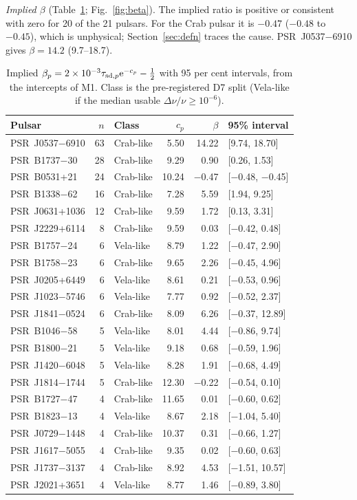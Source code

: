 \documentclass[fleqn,usenatbib]{mnras}
\newcommand{\dnu}{\Delta\nu/\nu}
\newcommand{\psr}[1]{PSR~#1}
\begin{document}
\emph{Implied $\beta$} (Table~\ref{tab:beta}; Fig.~\ref{fig:beta}). The
implied ratio is positive or consistent with zero for 20 of the 21 pulsars.
For the Crab pulsar it is $-0.47$ ($-0.48$ to $-0.45$), which is
unphysical; Section~\ref{sec:defn} traces the cause. \psr{J0537$-$6910}
gives $\beta=14.2$ (9.7--18.7).

\begin{table}
\centering
\caption{Implied $\beta_p=2\times10^{-3}\tau_{{\rm sd},p}{\rm e}^{-c_p}-
\tfrac12$ with 95 per cent intervals, from the intercepts of M1. Class is
the pre-registered D7 split (Vela-like if the median usable $\dnu\geq
10^{-6}$).}
\label{tab:beta}
\small
\footnotesize\setlength{\tabcolsep}{3pt}
\begin{tabular}{@{}lrlrrl@{}}
\toprule
Pulsar & $n$ & Class & $c_p$ & $\beta$ & 95\% interval\\
\midrule
PSR~J0537$-$6910 & 63 & Crab-like & 5.50 & 14.22 & [9.74, 18.70] \\
PSR~B1737$-$30 & 28 & Crab-like & 9.29 & 0.90 & [0.26, 1.53] \\
PSR~B0531+21 & 24 & Crab-like & 10.24 & $-$0.47 & [$-$0.48, $-$0.45] \\
PSR~B1338$-$62 & 16 & Crab-like & 7.28 & 5.59 & [1.94, 9.25] \\
PSR~J0631+1036 & 12 & Crab-like & 9.59 & 1.72 & [0.13, 3.31] \\
PSR~J2229+6114 & 8 & Crab-like & 9.59 & 0.03 & [$-$0.42, 0.48] \\
PSR~B1757$-$24 & 6 & Vela-like & 8.79 & 1.22 & [$-$0.47, 2.90] \\
PSR~B1758$-$23 & 6 & Crab-like & 9.65 & 2.26 & [$-$0.45, 4.96] \\
PSR~J0205+6449 & 6 & Vela-like & 8.61 & 0.21 & [$-$0.53, 0.96] \\
PSR~J1023$-$5746 & 6 & Vela-like & 7.77 & 0.92 & [$-$0.52, 2.37] \\
PSR~J1841$-$0524 & 6 & Crab-like & 8.09 & 6.26 & [$-$0.37, 12.89] \\
PSR~B1046$-$58 & 5 & Vela-like & 8.01 & 4.44 & [$-$0.86, 9.74] \\
PSR~B1800$-$21 & 5 & Vela-like & 9.18 & 0.68 & [$-$0.59, 1.96] \\
PSR~J1420$-$6048 & 5 & Vela-like & 8.28 & 1.91 & [$-$0.68, 4.49] \\
PSR~J1814$-$1744 & 5 & Crab-like & 12.30 & $-$0.22 & [$-$0.54, 0.10] \\
PSR~B1727$-$47 & 4 & Crab-like & 11.65 & 0.01 & [$-$0.60, 0.62] \\
PSR~B1823$-$13 & 4 & Vela-like & 8.67 & 2.18 & [$-$1.04, 5.40] \\
PSR~J0729$-$1448 & 4 & Crab-like & 10.37 & 0.31 & [$-$0.66, 1.27] \\
PSR~J1617$-$5055 & 4 & Crab-like & 9.35 & 0.02 & [$-$0.60, 0.63] \\
PSR~J1737$-$3137 & 4 & Crab-like & 8.92 & 4.53 & [$-$1.51, 10.57] \\
PSR~J2021+3651 & 4 & Vela-like & 8.77 & 1.46 & [$-$0.89, 3.80] \\
\bottomrule
\end{tabular}
\end{table}
\end{document}
